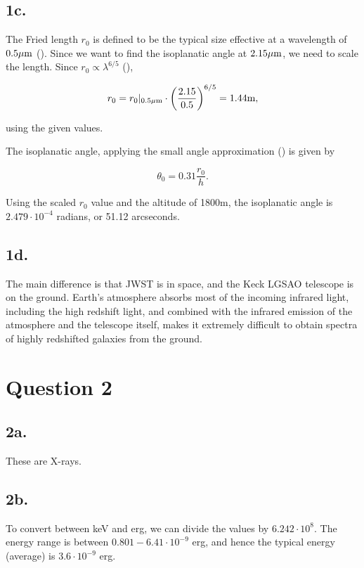 \documentclass{article}
\begin{document}
\subsection*{1c.}
The Fried length $r_0$ is defined to be the typical size effective at a wavelength of $0.5\mu\textup{m}$ (\cite{Rieke}). Since we want to find the isoplanatic angle at $2.15\mu\textup{m}$, we need to scale the length. Since $r_0\propto\lambda^{6/5}$ (\cite{Rieke}),

\begin{equation*}
r_0=r_0|_{0.5\mu\textup m}\cdot\left(\frac{2.15}{0.5}\right)^{6/5}=1.44\textup m,
\end{equation*}

using the given values.

The isoplanatic angle, applying the small angle approximation (\cite{Rieke}) is given by

\begin{equation}
    \theta_0=0.31\frac{r_0} h.
\end{equation}

Using the scaled $r_0$ value and the altitude of 1800m, the isoplanatic angle is $2.479\cdot10^{-4}$ radians, or 51.12 arcseconds.

\subsection*{1d.}
The main difference is that JWST is in space, and the Keck LGSAO telescope is on the ground. Earth's atmosphere absorbs most of the incoming infrared light, including the high redshift light, and combined with the infrared emission of the atmosphere and the telescope itself, makes it extremely difficult to obtain spectra of highly redshifted galaxies from the ground.

\section*{Question 2}

\subsection*{2a.}
These are X-rays.

\subsection*{2b.}
To convert between keV and erg, we can divide the values by $6.242\cdot10^8$. The energy range is between $0.801-6.41\cdot10^{-9}$ erg, and hence the typical energy (average) is $3.6\cdot10^{-9}$ erg.
\end{document}
